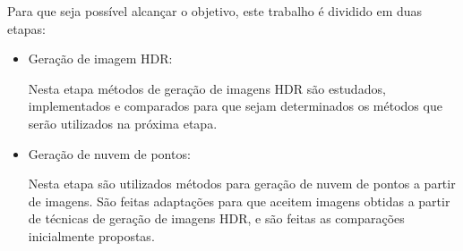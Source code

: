 Para que seja possível alcançar o objetivo, este trabalho é dividido em duas etapas:

\begin{itemize}
\item Geração de imagem HDR:

Nesta etapa métodos de geração de imagens HDR são estudados, implementados e comparados para que sejam determinados os métodos que serão utilizados na próxima etapa.
\item Geração de nuvem de pontos:

Nesta etapa são utilizados métodos para geração de nuvem de pontos a partir de imagens. São feitas adaptações para que aceitem imagens obtidas a partir de técnicas de geração de imagens HDR, e são feitas as comparações inicialmente propostas.
\end{itemize}
	